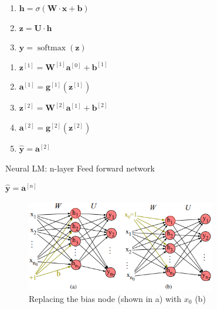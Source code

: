 
\begin{table}[H]
    \begin{minipage}{3.5cm}
        \begin{enumerate}
            \item $\mathbf{h} = \sigma(\mathbf{W}\cdot \mathbf{x} + \mathbf{b})$
            \item $\mathbf{z} = \mathbf{U} \cdot \mathbf{h}$
            \item $\mathbf{y} = \operatorname{softmax}(\mathbf{z})$
        \end{enumerate}
    \end{minipage}
    \hfill
    \begin{minipage}{4.2cm}
        \begin{enumerate}
            \item $\mathbf{z}^{[1]} = \mathbf{W}^{[1]}\mathbf{a}^{[0]} +\mathbf{b}^{[1]}$
            \vspace{0.15cm}
            \item $\mathbf{a}^{[1]} = \mathbf{g}^{[1]}(\mathbf{z}^{[1]})$
            \vspace{0.15cm}
            \item $\mathbf{z}^{[2]} = \mathbf{W}^{[2]}\mathbf{a}^{[1]} +\mathbf{b}^{[2]}$
            \vspace{0.15cm}
            \item $\mathbf{a}^{[2]} = \mathbf{g}^{[2]}(\mathbf{z}^{[2]})$
            \vspace{0.15cm}
            \item $\mathbf{\hat{y}} = \mathbf{a}^{[2]}$
        \end{enumerate}
    \end{minipage}
    \hfill
    \begin{minipage}{6cm}
        \begin{algorithm}[H]
            \caption{Neural LM: n-layer Feed forward network}
            
            $\mathbf{\hat{y}} = \mathbf{a}^{[n]}$\;
        \end{algorithm}
    \end{minipage}
\end{table}

\begin{figure}[H]
    \centering
    \includegraphics[height=4cm]{Pictures/nlp/neural-nn-replace_bias.png}
    \caption{Replacing the bias node (shown in a) with $x_0$ (b)}
\end{figure}

